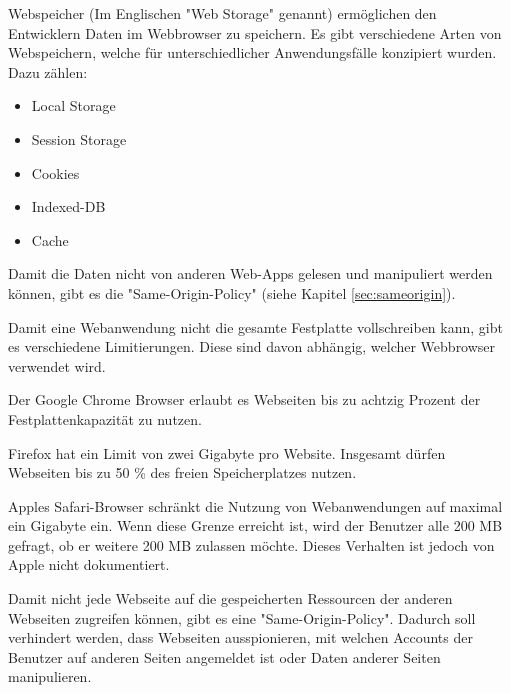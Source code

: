 \label{sec:webstorage}


Webspeicher (Im Englischen "Web Storage" genannt) ermöglichen den Entwicklern %
Daten im Webbrowser zu speichern.
Es gibt verschiedene Arten von Webspeichern, welche für unterschiedlicher Anwendungsfälle konzipiert wurden. Dazu zählen:

\begin{itemize}
    \item Local Storage
    \item Session Storage
    \item Cookies
    \item Indexed-DB
    \item Cache
\end{itemize}

Damit die Daten nicht von anderen Web-Apps gelesen und manipuliert werden können, gibt es die "Same-Origin-Policy" (siehe Kapitel \ref{sec:sameorigin}).


Damit eine Webanwendung nicht die gesamte Festplatte vollschreiben kann, gibt es verschiedene Limitierungen. Diese sind davon abhängig, welcher Webbrowser verwendet wird.

Der Google Chrome Browser erlaubt es Webseiten bis zu achtzig Prozent der Festplattenkapazität zu nutzen.

Firefox hat ein Limit von zwei Gigabyte pro Website. Insgesamt dürfen Webseiten bis zu 50 \% des freien Speicherplatzes nutzen.

Apples Safari-Browser schränkt die Nutzung von Webanwendungen auf maximal ein Gigabyte ein. Wenn diese Grenze erreicht ist, wird der Benutzer alle 200 MB gefragt, ob er weitere 200 MB zulassen möchte. Dieses Verhalten ist jedoch von Apple nicht dokumentiert. \cite{WebDevStorage}

 \label{sec:sameorigin}

Damit nicht jede Webseite auf die gespeicherten Ressourcen der anderen Webseiten zugreifen können, gibt es eine "Same-Origin-Policy".
Dadurch soll verhindert werden, dass Webseiten ausspionieren, mit welchen Accounts der Benutzer auf anderen Seiten angemeldet ist oder Daten anderer Seiten manipulieren.

